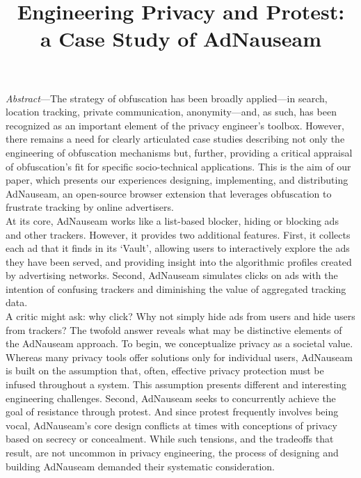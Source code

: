 \documentclass[conference]{IEEEtran}
\begin{document}
\title{Engineering Privacy and Protest:\\a Case Study of AdNauseam}

\author{
   \and
}

\maketitle

\emph{Abstract}---The strategy of obfuscation has been broadly applied---in search, location tracking, private communication, anonymity---and, as such, has been recognized as an important element of the privacy engineer's toolbox. However, there remains a need for clearly articulated case studies describing not only the engineering of obfuscation mechanisms but, further, providing a critical appraisal of obfuscation's fit for specific socio-technical applications. This is the aim of our paper, which presents our experiences designing, implementing, and distributing AdNauseam, an open-source browser extension that leverages obfuscation to frustrate tracking by online advertisers.\\
\indent At its core, AdNauseam works like a list-based blocker, hiding or blocking ads and other trackers. However, it provides two additional features. First, it collects each ad that it finds in its ‘Vault’, allowing users to interactively explore the ads they have been served, and providing insight into the algorithmic profiles created by advertising networks. Second, AdNauseam simulates clicks on ads with the intention of confusing trackers and diminishing the value of aggregated tracking data.\\
\indent A critic might ask: why click? Why not simply hide ads from users and hide users from trackers? The twofold answer reveals what may be distinctive elements of the AdNauseam approach. To begin, we conceptualize privacy as a societal value. Whereas many privacy tools offer solutions only for individual users, AdNauseam is built on the assumption that, often, effective privacy protection must be infused throughout a system. This assumption presents different and interesting engineering challenges. Second, AdNauseam seeks to concurrently achieve the goal of resistance through protest. And since protest frequently involves being vocal, AdNauseam's core design conflicts at times with conceptions of privacy based on secrecy or concealment. While such tensions, and the tradeoffs that result, are not uncommon in privacy engineering, the process of designing and building AdNauseam demanded their systematic consideration.\\
\end{document}
